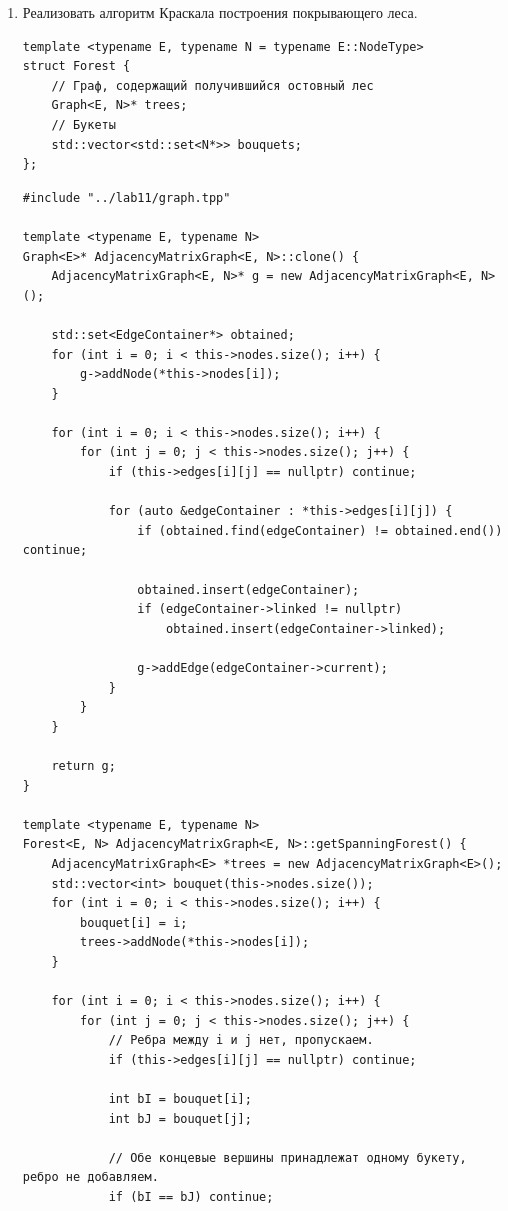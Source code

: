 \documentclass[a4paper,14pt]{extarticle}
\begin{document}
\begin{enumerate}[1.]
    \item Реализовать алгоритм Краскала построения покрывающего леса.\\
        \begin{verbatim}
template <typename E, typename N = typename E::NodeType>
struct Forest {
    // Граф, содержащий получившийся остовный лес
    Graph<E, N>* trees;
    // Букеты
    std::vector<std::set<N*>> bouquets;
};
        \end{verbatim}
        \begin{verbatim}
#include "../lab11/graph.tpp"

template <typename E, typename N>
Graph<E>* AdjacencyMatrixGraph<E, N>::clone() {
    AdjacencyMatrixGraph<E, N>* g = new AdjacencyMatrixGraph<E, N>();
    
    std::set<EdgeContainer*> obtained;
    for (int i = 0; i < this->nodes.size(); i++) {
        g->addNode(*this->nodes[i]);
    }

    for (int i = 0; i < this->nodes.size(); i++) {
        for (int j = 0; j < this->nodes.size(); j++) {
            if (this->edges[i][j] == nullptr) continue;

            for (auto &edgeContainer : *this->edges[i][j]) {
                if (obtained.find(edgeContainer) != obtained.end()) continue;

                obtained.insert(edgeContainer);
                if (edgeContainer->linked != nullptr) 
                    obtained.insert(edgeContainer->linked);

                g->addEdge(edgeContainer->current);
            }
        }
    }

    return g;
}

template <typename E, typename N>
Forest<E, N> AdjacencyMatrixGraph<E, N>::getSpanningForest() {
    AdjacencyMatrixGraph<E> *trees = new AdjacencyMatrixGraph<E>();
    std::vector<int> bouquet(this->nodes.size());
    for (int i = 0; i < this->nodes.size(); i++) {
        bouquet[i] = i;
        trees->addNode(*this->nodes[i]);
    }

    for (int i = 0; i < this->nodes.size(); i++) {
        for (int j = 0; j < this->nodes.size(); j++) {
            // Ребра между i и j нет, пропускаем.
            if (this->edges[i][j] == nullptr) continue;

            int bI = bouquet[i];
            int bJ = bouquet[j];

            // Обе концевые вершины принадлежат одному букету, ребро не добавляем.
            if (bI == bJ) continue;


\end{verbatim}
\end{enumerate}
\end{document}
